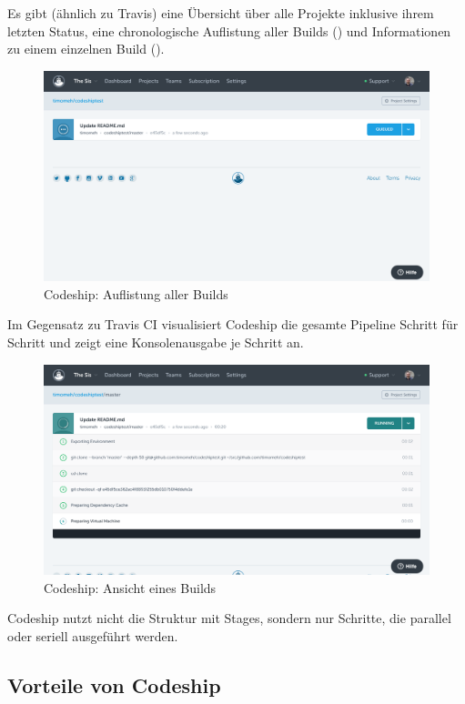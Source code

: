 Es gibt (ähnlich zu Travis) eine Übersicht über alle Projekte inklusive ihrem letzten Status, eine chronologische Auflistung aller Builds () und Informationen zu einem einzelnen Build ().

\begin{figure}[h]
  \caption{Codeship: Auflistung aller Builds}
  \label{fig:codeship-builds}
  \includegraphics[width=.8\textwidth]{assets/codeship-builds}
\end{figure}

Im Gegensatz zu Travis CI visualisiert Codeship die gesamte Pipeline Schritt für Schritt und zeigt eine Konsolenausgabe je Schritt an.

\begin{figure}[h]
  \caption{Codeship: Ansicht eines Builds}
  \label{fig:codeship-build-details}
  \includegraphics[width=.8\textwidth]{assets/codeship-build-details}
\end{figure}

Codeship nutzt nicht die Struktur mit Stages, sondern nur Schritte, die parallel oder seriell ausgeführt werden.

\subsection*{Vorteile von Codeship}

